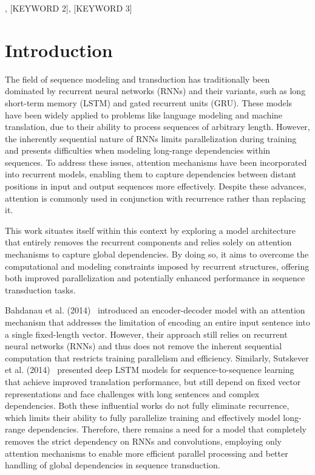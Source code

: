 \documentclass[journal]{IEEEtran}
\begin{document}
\begin{IEEEkeywords}
[KEYWORD 1], [KEYWORD 2], [KEYWORD 3]
\end{IEEEkeywords}

\IEEEpeerreviewmaketitle


\section{Introduction}


The field of sequence modeling and transduction has traditionally been dominated by recurrent neural networks (RNNs) and their variants, such as long short-term memory (LSTM) and gated recurrent units (GRU). These models have been widely applied to problems like language modeling and machine translation, due to their ability to process sequences of arbitrary length. However, the inherently sequential nature of RNNs limits parallelization during training and presents difficulties when modeling long-range dependencies within sequences. To address these issues, attention mechanisms have been incorporated into recurrent models, enabling them to capture dependencies between distant positions in input and output sequences more effectively. Despite these advances, attention is commonly used in conjunction with recurrence rather than replacing it.

This work situates itself within this context by exploring a model architecture that entirely removes the recurrent components and relies solely on attention mechanisms to capture global dependencies. By doing so, it aims to overcome the computational and modeling constraints imposed by recurrent structures, offering both improved parallelization and potentially enhanced performance in sequence transduction tasks.

Bahdanau et al. (2014)~\cite{bahdanau2014neuralmt} introduced an encoder-decoder model with an attention mechanism that addresses the limitation of encoding an entire input sentence into a single fixed-length vector. However, their approach still relies on recurrent neural networks (RNNs) and thus does not remove the inherent sequential computation that restricts training parallelism and efficiency. Similarly, Sutskever et al. (2014)~\cite{sutskever2014seq2seq} presented deep LSTM models for sequence-to-sequence learning that achieve improved translation performance, but still depend on fixed vector representations and face challenges with long sentences and complex dependencies. Both these influential works do not fully eliminate recurrence, which limits their ability to fully parallelize training and effectively model long-range dependencies. Therefore, there remains a need for a model that completely removes the strict dependency on RNNs and convolutions, employing only attention mechanisms to enable more efficient parallel processing and better handling of global dependencies in sequence transduction.
\end{document}
